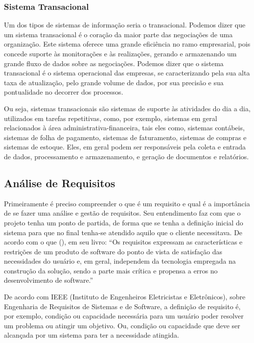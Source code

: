 \subsubsection{Sistema Transacional}

Um dos tipos de sistemas de informação seria o transacional. Podemos dizer que um sistema transacional é o coração da maior parte das negociações de uma organização. Este sistema oferece uma grande eficiência no ramo empresarial, pois concede suporte às monitorações e às realizações, gerando e armazenando um grande fluxo de dados sobre as negociações. Podemos dizer que o sistema transacional é o sistema operacional das empresas, se caracterizando pela sua alta taxa de atualização, pelo grande volume de dados, por sua precisão e sua pontualidade no decorrer dos processos.

Ou seja, sistemas transacionais são sistemas de suporte às atividades do dia a dia, utilizados em tarefas repetitivas, como, por exemplo, sistemas em geral relacionados à área administrativa-financeira, tais eles como, sistemas contábeis, sistemas de folha de pagamento, sistemas de faturamento, sistemas de compras e sistemas de estoque. Eles, em geral podem ser responsáveis pela coleta e entrada de dados, processamento e armazenamento, e geração de documentos e relatórios.
\subsection{Análise de Requisitos}

Primeiramente é preciso compreender o que é um requisito e qual é a importância de se fazer uma análise e gestão de requisitos. Seu entendimento faz com que o projeto tenha um ponto de partida, de forma que se tenha a definição inicial do sistema para que no final tenha-se atendido aquilo que o cliente necessitava. De acordo com o que (\cite{machado-2011}), em seu livro: “Os requisitos expressam as características e restrições de um produto de software do ponto de vista de satisfação das necessidades do usuário e, em geral, independem da tecnologia empregada na construção da solução, sendo a parte mais crítica e propensa a erros no desenvolvimento de software.” 

De acordo com IEEE (Instituto de Engenheiros Eletricistas e Eletrônicos), sobre Engenharia de Requisitos de Sistemas e de Software, a definição de requisito é, por exemplo, condição ou capacidade necessária para um usuário poder resolver um problema ou atingir um objetivo. Ou, condição ou capacidade que deve ser alcançada por um sistema para ter a necessidade atingida.

